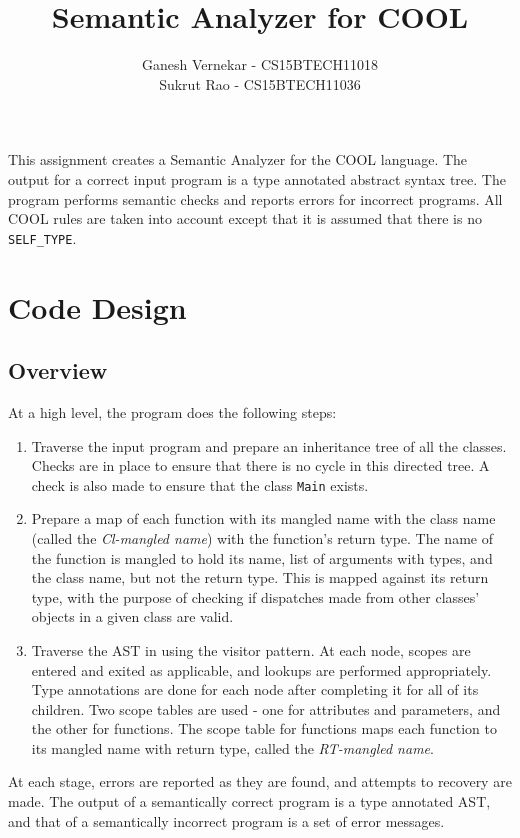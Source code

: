 \documentclass{article}
\title{Semantic Analyzer for COOL}
\author{Ganesh Vernekar - CS15BTECH11018 \\ Sukrut Rao - CS15BTECH11036}
\begin{document}
	\maketitle
	
This assignment creates a Semantic Analyzer for the COOL language. The output for a correct input program is a type annotated abstract syntax tree. The program performs semantic checks and reports errors for incorrect programs. All COOL rules are taken into account except that it is assumed that there is no \verb|SELF_TYPE|.
	
\section{Code Design}
\subsection{Overview}
At a high level, the program does the following steps:
\begin{enumerate}
	\item Traverse the input program and prepare an inheritance tree of all the classes. Checks are in place to ensure that there is no cycle in this directed tree. A check is also made to ensure that the class \verb|Main| exists.
	\item Prepare a map of each function with its mangled name with the class name (called the \textit{Cl-mangled name}) with the function's return type. The name of the function is mangled to hold its name, list of arguments with types, and the class name, but not the return type. This is mapped against its return type, with the purpose of checking if dispatches made from other classes' objects in a given class are valid.
	\item Traverse the AST in using the visitor pattern. At each node, scopes are entered and exited as applicable, and lookups are performed appropriately. Type annotations are done for each node after completing it for all of its children. Two scope tables are used - one for attributes and parameters, and the other for functions. The scope table for functions maps each function to its mangled name with return type, called the \textit{RT-mangled name}.
\end{enumerate}
At each stage, errors are reported as they are found, and attempts to recovery are made. The output of a semantically correct program is a type annotated AST, and that of a semantically incorrect program is a set of error messages.
\end{document}
